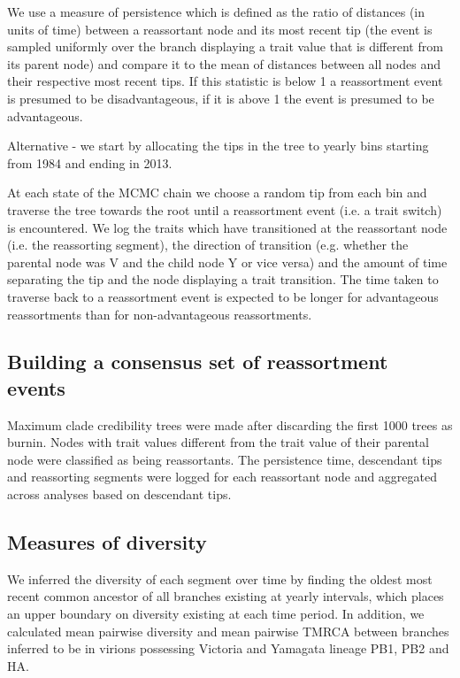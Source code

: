\documentclass[11pt,oneside,letterpaper]{article}
\begin{document}
We use a measure of persistence which is defined as the ratio of distances (in units of time) between a reassortant node and its most recent tip (the event is sampled uniformly over the branch displaying a trait value that is different from its parent node) and compare it to the mean of distances between all nodes and their respective most recent tips. 
If this statistic is below 1 a reassortment event is presumed to be disadvantageous, if it is above 1 the event is presumed to be advantageous.

Alternative - we start by allocating the tips in the tree to yearly bins starting from 1984 and ending in 2013. 

At each state of the MCMC chain we choose a random tip from each bin and traverse the tree towards the root until a reassortment event (i.e. a trait switch) is encountered.
We log the traits which have transitioned at the reassortant node (i.e. the reassorting segment), the direction of transition (e.g. whether the parental node was V and the child node Y or vice versa) and the amount of time separating the tip and the node displaying a trait transition. 
The time taken to traverse back to a reassortment event is expected to be longer for advantageous reassortments than for non-advantageous reassortments.


\subsection*{Building a consensus set of reassortment events}
Maximum clade credibility trees were made after discarding the first 1000 trees as burnin. 
Nodes with trait values different from the trait value of their parental node were classified as being reassortants.
The persistence time, descendant tips and reassorting segments were logged for each reassortant node and aggregated across analyses based on descendant tips.


\subsection*{Measures of diversity}
We inferred the diversity of each segment over time by finding the oldest most recent common ancestor of all branches existing at yearly intervals, which places an upper boundary on diversity existing at each time period.
In addition, we calculated mean pairwise diversity and mean pairwise TMRCA between branches inferred to be in virions possessing Victoria and Yamagata lineage PB1, PB2 and HA.
\end{document}
